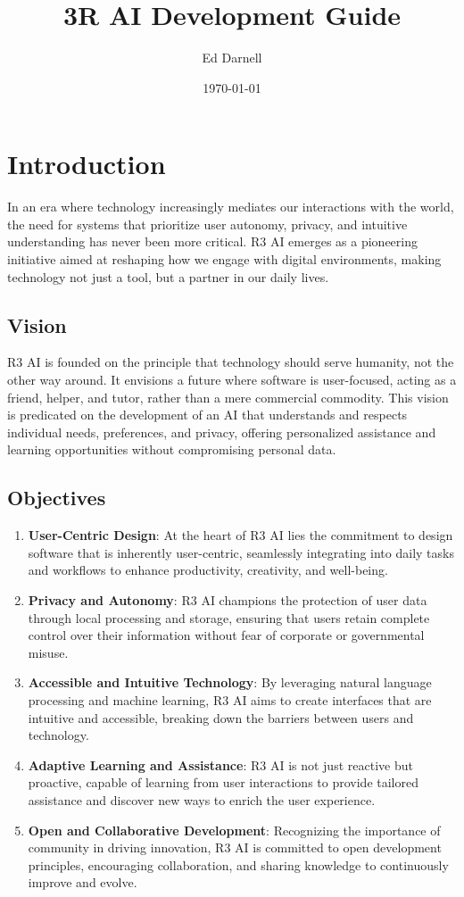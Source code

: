 \documentclass[12pt]{article}
\title{3R AI Development Guide}
\author{Ed Darnell}
\date{\today}
\begin{document}
\maketitle
\section*{Introduction}

In an era where technology increasingly mediates our interactions with the world, the need for systems that prioritize user autonomy, privacy, and intuitive understanding has never been more critical. R3 AI emerges as a pioneering initiative aimed at reshaping how we engage with digital environments, making technology not just a tool, but a partner in our daily lives.

\subsection*{Vision}

R3 AI is founded on the principle that technology should serve humanity, not the other way around. It envisions a future where software is user-focused, acting as a friend, helper, and tutor, rather than a mere commercial commodity. This vision is predicated on the development of an AI that understands and respects individual needs, preferences, and privacy, offering personalized assistance and learning opportunities without compromising personal data.

\subsection*{Objectives}

\begin{enumerate}
    \item \textbf{User-Centric Design}: At the heart of R3 AI lies the commitment to design software that is inherently user-centric, seamlessly integrating into daily tasks and workflows to enhance productivity, creativity, and well-being.
    \item \textbf{Privacy and Autonomy}: R3 AI champions the protection of user data through local processing and storage, ensuring that users retain complete control over their information without fear of corporate or governmental misuse.
    \item \textbf{Accessible and Intuitive Technology}: By leveraging natural language processing and machine learning, R3 AI aims to create interfaces that are intuitive and accessible, breaking down the barriers between users and technology.
    \item \textbf{Adaptive Learning and Assistance}: R3 AI is not just reactive but proactive, capable of learning from user interactions to provide tailored assistance and discover new ways to enrich the user experience.
    \item \textbf{Open and Collaborative Development}: Recognizing the importance of community in driving innovation, R3 AI is committed to open development principles, encouraging collaboration, and sharing knowledge to continuously improve and evolve.
\end{enumerate}
\end{document}
